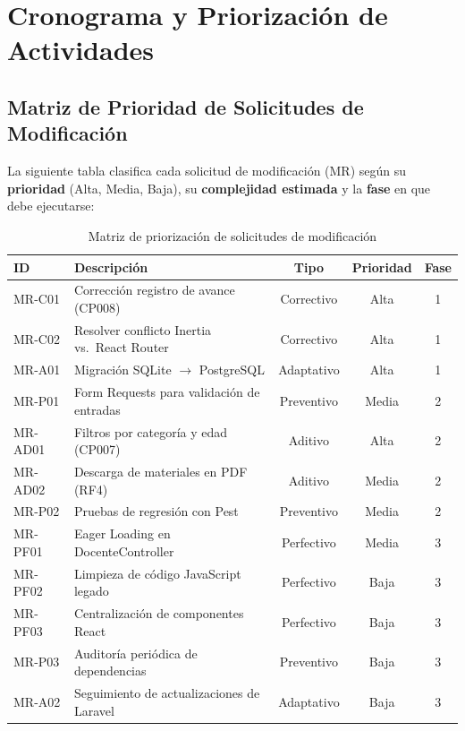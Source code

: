 
\chapter{Cronograma y Priorización de Actividades}

\section{Matriz de Prioridad de Solicitudes de Modificación}

La siguiente tabla clasifica cada solicitud de modificación (MR) según su
\textbf{prioridad} (Alta, Media, Baja), su \textbf{complejidad estimada} y la
\textbf{fase} en que debe ejecutarse:

\begin{table}[H]
\centering
\begin{tabular}{llccc}
\toprule
\textbf{ID} & \textbf{Descripción} & \textbf{Tipo} & \textbf{Prioridad} & \textbf{Fase} \\
\midrule
MR-C01  & Corrección registro de avance (CP008)        & Correctivo   & Alta   & 1 \\
MR-C02  & Resolver conflicto Inertia vs.\ React Router & Correctivo   & Alta   & 1 \\
MR-A01  & Migración SQLite $\rightarrow$ PostgreSQL     & Adaptativo   & Alta   & 1 \\
MR-P01  & Form Requests para validación de entradas     & Preventivo   & Media  & 2 \\
MR-AD01 & Filtros por categoría y edad (CP007)          & Aditivo      & Alta   & 2 \\
MR-AD02 & Descarga de materiales en PDF (RF4)           & Aditivo      & Media  & 2 \\
MR-P02  & Pruebas de regresión con Pest                 & Preventivo   & Media  & 2 \\
MR-PF01 & Eager Loading en DocenteController            & Perfectivo   & Media  & 3 \\
MR-PF02 & Limpieza de código JavaScript legado          & Perfectivo   & Baja   & 3 \\
MR-PF03 & Centralización de componentes React           & Perfectivo   & Baja   & 3 \\
MR-P03  & Auditoría periódica de dependencias           & Preventivo   & Baja   & 3 \\
MR-A02  & Seguimiento de actualizaciones de Laravel     & Adaptativo   & Baja   & 3 \\
\bottomrule
\end{tabular}
\caption{Matriz de priorización de solicitudes de modificación}
\label{tab:cronograma}
\end{table}

